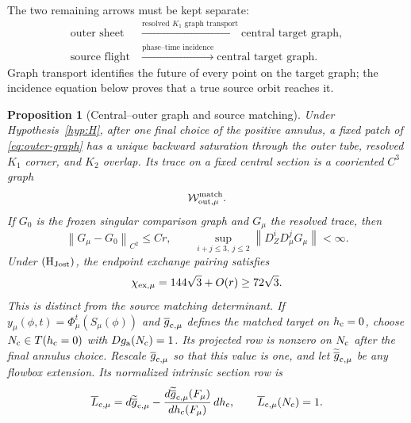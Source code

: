 \documentclass[11pt,reqno]{amsart}
\numberwithin{equation}{section}
\newtheorem{proposition}[theorem]{Proposition}
\theoremstyle{definition}
\theoremstyle{remark}
\newcommand{\cW}{\mathcal W}
\newcommand{\norm}[1]{\left\lVert #1\right\rVert}
\begin{document}
The two remaining arrows must be kept separate:
\[
 \begin{aligned}
  \text{outer sheet}
    &\xrightarrow{\text{resolved }K_1\text{ graph transport}}
      \text{central target graph},\\
  \text{source flight}
    &\xrightarrow{\text{phase--time incidence}}
      \text{central target graph}.
 \end{aligned}
\]
Graph transport identifies the future of every point on the target graph;
the incidence equation below proves that a true source orbit reaches it.

\begin{proposition}[Central--outer graph and source matching]\label{prop:matching}
Under Hypothesis~\ref{hyp:H}, after one final choice of the positive annulus,
a fixed patch of
\eqref{eq:outer-graph} has a unique backward saturation through the outer
tube, resolved $K_1$ corner, and $K_2$ overlap.  Its trace on a fixed central
section is a cooriented $C^3$ graph
\begin{equation}\label{eq:matched-sheet}
 \cW^{\rm match}_{\rm out,\mu}.
\end{equation}
If $G_0$ is the frozen singular comparison graph and $G_\mu$ the resolved
trace, then
\begin{equation}\label{eq:matched-O-r}
 \norm{G_\mu-G_0}_{C^2}\le Cr,\qquad
 \sup_{i+j\le3,\ j\le2}\norm{D_Z^iD_\mu^jG_\mu}<\infty.
\end{equation}
Under ${\rm(H_{Jost})}$, the endpoint exchange pairing satisfies
\begin{equation}\label{eq:exchange-positive}
 \chi_{{\rm ex},\mu}=144\sqrt3+O(r)\ge72\sqrt3.
\end{equation}
This is distinct from the source matching determinant.  If
$y_\mu(\phi,t)=\Phi_\mu^t(S_\mu(\phi))$ and
$\overline g_{{\rm c},\mu}$ defines the matched target on
$h_{\rm c}=0$, choose $N_{\rm c}\in T(h_{\rm c}=0)$ with
$Dg_{\rm a}(N_{\rm c})=1$.  Its projected row is nonzero on $N_{\rm c}$
after the final annulus choice.  Rescale $\overline g_{{\rm c},\mu}$ so that
this value is one, and let $\widetilde{\overline g}_{{\rm c},\mu}$ be any
flowbox extension.  Its normalized intrinsic section row is
\begin{equation}\label{eq:central-target-row}
 \overline L_{{\rm c},\mu}
 =d\widetilde{\overline g}_{{\rm c},\mu}
  -\frac{d\widetilde{\overline g}_{{\rm c},\mu}(F_\mu)}
         {dh_{\rm c}(F_\mu)}\,dh_{\rm c},
 \qquad \overline L_{{\rm c},\mu}(N_{\rm c})=1.
\end{equation}

\end{proposition}
\end{document}
